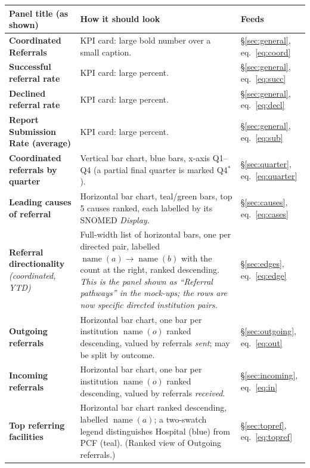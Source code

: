 \documentclass[11pt]{article}
\newcommand{\name}{\operatorname{name}}
\begin{document}
\begingroup
\footnotesize
\setlength{\tabcolsep}{5pt}
\begin{longtable}{>{\raggedright\arraybackslash}p{4.3cm} >{\raggedright\arraybackslash}p{6.4cm} >{\raggedright\arraybackslash}p{3.2cm}}
\rowcolor{headbg}
\textbf{\color{white}Panel title (as shown)} & \textbf{\color{white}How it should look} & \textbf{\color{white}Feeds}\\
\endhead
\textbf{Coordinated Referrals} & KPI card: large bold number over a small caption. & \S\ref{sec:general}, eq.~\eqref{eq:coord}\\
\textbf{Successful referral rate} & KPI card: large percent. & \S\ref{sec:general}, eq.~\eqref{eq:succ}\\
\textbf{Declined referral rate} & KPI card: large percent. & \S\ref{sec:general}, eq.~\eqref{eq:decl}\\
\textbf{Report Submission Rate (average)} & KPI card: large percent. & \S\ref{sec:general}, eq.~\eqref{eq:sub}\\
\textbf{Coordinated referrals by quarter} & Vertical bar chart, blue bars, x-axis Q1--Q4 (a partial final quarter is marked Q4$^{*}$). & \S\ref{sec:quarter}, eq.~\eqref{eq:quarter}\\
\textbf{Leading causes of referral} & Horizontal bar chart, teal/green bars, top 5 causes ranked, each labelled by its SNOMED \emph{Display}. & \S\ref{sec:causes}, eq.~\eqref{eq:cases}\\
\textbf{Referral directionality} \emph{(coordinated, YTD)} & Full-width list of horizontal bars, one per directed pair, labelled $\name(a)\!\to\!\name(b)$ with the count at the right, ranked descending. \emph{This is the panel shown as ``Referral pathways'' in the mock-ups; the rows are now specific directed institution pairs.} & \S\ref{sec:edges}, eq.~\eqref{eq:edge}\\
\textbf{Outgoing referrals} & Horizontal bar chart, one bar per institution $\name(o)$ ranked descending, valued by referrals \emph{sent}; may be split by outcome. & \S\ref{sec:outgoing}, eq.~\eqref{eq:out}\\
\textbf{Incoming referrals} & Horizontal bar chart, one bar per institution $\name(o)$ ranked descending, valued by referrals \emph{received}. & \S\ref{sec:incoming}, eq.~\eqref{eq:in}\\
\textbf{Top referring facilities} & Horizontal bar chart ranked descending, labelled $\name(a)$; a two-swatch legend distinguishes Hospital (blue) from PCF (teal). (Ranked view of Outgoing referrals.) & \S\ref{sec:topref}, eq.~\eqref{eq:topref}\\

\end{longtable}
\end{document}

